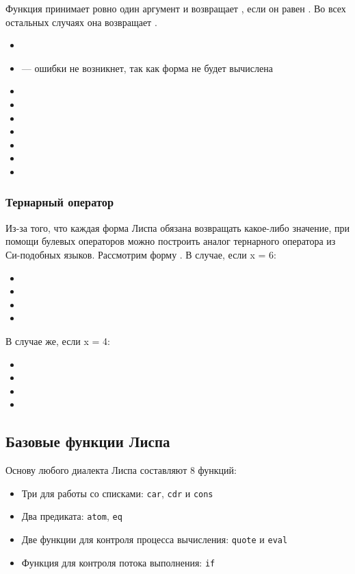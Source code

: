 \documentclass[a4paper, 12pt, titlepage, twoside]{article}
\newenvironment{examples}
               {\begin{itemize}\renewcommand{\labelitemi}{ }}
               {\end{itemize}}
\begin{document}
Функция  принимает ровно один аргумент и возвращает , если он равен . Во всех остальных случаях она возвращает .
\begin{examples}
\item {}
\item {} --- ошибки не возникнет, так как форма  не будет вычислена
\item {}
\item {}
\item {}
\item {}
\item {}
\item {}
\item {}
\end{examples}
\subsubsection{Тернарный оператор}
Из-за того, что каждая форма Лиспа обязана возвращать какое-либо значение, при помощи булевых операторов можно построить аналог тернарного оператора из Си-подобных языков.
Рассмотрим форму . В случае, если x = 6:
\begin{examples}
\item {}
\item {}
\item {}
\item {}
\end{examples}
В случае же, если x = 4:
\begin{examples}
\item {}
\item {}
\item {}
\item {}
\end{examples}
\subsection{Базовые функции Лиспа}
Основу любого диалекта Лиспа составляют 8 функций:
\begin{itemize}
\item[] Три для работы со списками: \texttt{car}, \texttt{cdr} и \texttt{cons}
\item[] Два предиката: \texttt{atom}, \texttt{eq}
\item[] Две функции для контроля процесса вычисления: \texttt{quote} и \texttt{eval}
\item[] Функция для контроля потока выполнения: \texttt{if}
\end{itemize}
\end{document}
